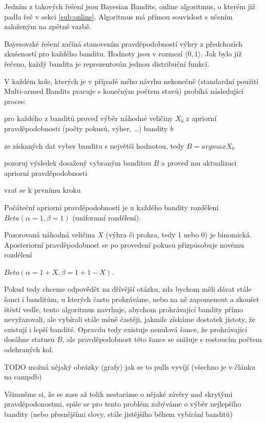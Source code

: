 \documentclass[thesis=M,czech]{FITthesis}[2014/05/07]
\begin{document}
Jedním z takových řešení jsou Bayesian Bandits, online algoritmus, o kterém již padla řeč v sekci \ref{sub:online}. Algoritmus má přímou souvislost s učením založeným na zpětné vazbě.

Bayesovské řešení začíná stanovením pravděpodobností výhry z předchozích zkušeností pro každého banditu. Hodnoty jsou v rozmezí $\langle0,1\rangle$. Jak bylo již řečeno, každý bandita je reprezentován jednou distribuční funkcí.

V každém kole, kterých je v případě mého návrhu nekonečně (standardní použití Multi-armed Bandits pracuje s konečným počtem stavů) probíhá následující proces:

\begin{description}
	\item pro každého z banditů proveď výběr náhodné veličiny $X_b$ z apriorní pravděpodobnosti (počty pokusů, výher, \ldots) bandity $b$
	\item ze získaných dat vyber banditu s největší hodnotou, tedy $B = argmax X_b$	
	\item pozoruj výsledek dosažený vybraným banditou $B$ a proveď mu aktualizaci apriorní pravděpodobnosti	
	\item vrať se k prvnímu kroku
\end{description}

Počáteční apriorní pravděpodobností je u každého bandity rozdělení ${Beta}(\alpha = 1, \beta = 1)$ (uniformní rozdělení).

Pozorovaná náhodná veličina $X$ (výhra či prohra, tedy 1 nebo 0) je binomická. Aposteriorní pravděpodobnost se po provedení pokusu přizpůsobuje novému rozdělení

\begin{center}
${Beta}(\alpha = 1 + X, \beta = 1 + 1 - X)$.
\end{center}

Pokud tedy chceme odpovědět na dřívější otázku, zda bychom měli dávat stále šanci i banditům, u kterých často prohráváme, nebo na ně zapomenout a zkoušet štěstí vedle, tento algoritmus navrhuje, abychom prohrávající bandity přímo nevyřazovali, ale vybírali stále méně častěji, jakmile získáme dostatek jistoty, že existují i lepší bandité. Opravdu tedy existuje nenulová šance, že prohrávající dosáhne statusu $B$, ale pravděpodobnost této šance se snižuje s rostoucím počtem odehraných kol. 

TODO možná nějaký obrázky (grafy) jak se to pulls vyvíjí (všechno je v článku na campdb)

Všimněme si, že se zase až tolik nestaráme o nějaké závěry nad skrytými pravděpodonostmi, spíše se pro tento problém zabýváme o výběr nejlepšího bandity (nebo přesnějšími slovy, stále jistějšího během vybírání banditů)
\end{document}
